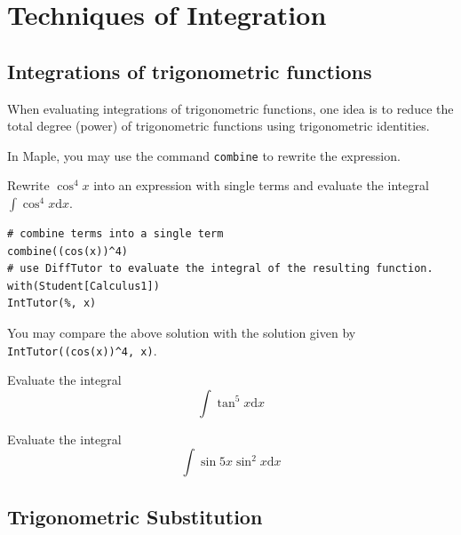 \documentclass[en,11pt,simple]{elegantbook}
\let\BeginKnitrBlock\begin \let\EndKnitrBlock\end
\begin{document}
\hypertarget{techniques-of-integration}{%
\chapter{Techniques of Integration}\label{techniques-of-integration}}

\hypertarget{integrations-of-trigonometric-functions}{%
\section{Integrations of trigonometric functions}\label{integrations-of-trigonometric-functions}}

When evaluating integrations of trigonometric functions, one idea is to reduce the total degree (power) of trigonometric functions using trigonometric identities.

In Maple, you may use the command \texttt{combine} to rewrite the expression.

\BeginKnitrBlock{example}{}{}
\protect\hypertarget{exm:unnamed-chunk-200}{}{\label{exm:unnamed-chunk-200} }
Rewrite \(\cos^4x\) into an expression with single terms and evaluate the integral \(\int \cos^4x\mathrm{d} x\).
\EndKnitrBlock{example}

\BeginKnitrBlock{solution}{}{}
{}

\begin{verbatim}
# combine terms into a single term
combine((cos(x))^4)
# use DiffTutor to evaluate the integral of the resulting function.
with(Student[Calculus1])
IntTutor(%, x)
\end{verbatim}
\EndKnitrBlock{solution}

You may compare the above solution with the solution given by \texttt{IntTutor((cos(x))\^{}4,\ x)}.

\BeginKnitrBlock{exercise}{}{}
\protect\hypertarget{exr:unnamed-chunk-202}{}{\label{exr:unnamed-chunk-202} }
Evaluate the integral
\[
\int \tan ^{5} x \mathrm{d} x
\]
\EndKnitrBlock{exercise}

\BeginKnitrBlock{exercise}{}{}
\protect\hypertarget{exr:unnamed-chunk-203}{}{\label{exr:unnamed-chunk-203} }
Evaluate the integral
\[
\int \sin 5 x \sin^2 x \mathrm{d} x
\]
\EndKnitrBlock{exercise}

\hypertarget{trigonometric-substitution}{%
\section{Trigonometric Substitution}\label{trigonometric-substitution}}
\end{document}
